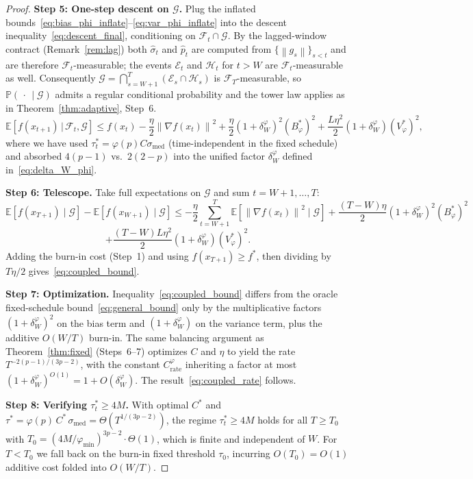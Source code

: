 \documentclass[11pt]{article}
\theoremstyle{definition}
\newcommand{\E}{\mathbb{E}}
\newcommand{\Prob}{\mathbb{P}}
\newcommand{\norm}[1]{\left\| #1 \right\|}
\newcommand{\phat}{\hat{p}}
\newcommand{\shat}{\hat{\sigma}}
\newcommand{\Filt}{\mathcal{F}}
\begin{document}
\begin{proof}
\medskip
\textbf{Step 5: One-step descent on $\mathcal{G}$.}
Plug the inflated bounds~\eqref{eq:bias_phi_inflate}--\eqref{eq:var_phi_inflate}
into the descent inequality~\eqref{eq:descent_final}, conditioning on
$\Filt_t \cap \mathcal{G}$. By the lagged-window contract
\textup{(}Remark~\ref{rem:lag}\textup{)} both $\shat_t$ and $\phat_t$ are
computed from $\{\norm{g_s}\}_{s < t}$ and are therefore
$\Filt_{t}$-measurable; the events $\mathcal{E}_t$ and $\mathcal{H}_t$ for
$t > W$ are $\Filt_t$-measurable as well. Consequently
$\mathcal G = \bigcap_{s = W+1}^T (\mathcal E_s \cap \mathcal H_s)$ is
$\Filt_T$-measurable, so $\Prob(\,\cdot\,\mid\mathcal G)$ admits a regular
conditional probability and the tower law applies as in Theorem~\ref{thm:adaptive}, Step~6.
\begin{equation}\label{eq:coupled_one_step}
  \E\!\left[f(x_{t+1}) \,\big|\, \Filt_t, \mathcal{G}\right]
  \leq f(x_t) - \frac{\eta}{2}\norm{\nabla f(x_t)}^2
    + \frac{\eta}{2}(1 + \delta_W^\varphi)^2 (B^{*}_\varphi)^2
    + \frac{L\eta^2}{2}(1 + \delta_W^\varphi)(V^{*}_\varphi)^2,
\end{equation}
where we have used $\tau_t^{*} = \varphi(p) C \sigma_{\mathrm{med}}$
(time-independent in the fixed schedule) and absorbed $4(p-1)$ vs.\ $2(2-p)$
into the unified factor $\delta_W^\varphi$ defined in~\eqref{eq:delta_W_phi}.

\medskip
\textbf{Step 6: Telescope.}
Take full expectations on $\mathcal{G}$ and sum
$t = W+1, \ldots, T$:
\[
  \E\!\left[f(x_{T+1}) \mid \mathcal{G}\right] - \E\!\left[f(x_{W+1}) \mid \mathcal{G}\right]
  \leq -\frac{\eta}{2}\sum_{t=W+1}^T \E\!\left[\norm{\nabla f(x_t)}^2 \mid \mathcal{G}\right]
    + \frac{(T-W)\eta}{2}(1 + \delta_W^\varphi)^2 (B^{*}_\varphi)^2
\]
\[
    + \frac{(T-W)L\eta^2}{2}(1 + \delta_W^\varphi)(V^{*}_\varphi)^2.
\]
Adding the burn-in cost (Step~1) and using $f(x_{T+1}) \geq f^{*}$, then
dividing by $T\eta/2$ gives~\eqref{eq:coupled_bound}.

\medskip
\textbf{Step 7: Optimization.}
Inequality~\eqref{eq:coupled_bound} differs from the oracle fixed-schedule
bound~\eqref{eq:general_bound} only by the multiplicative factors
$(1 + \delta_W^\varphi)^2$ on the bias term and $(1 + \delta_W^\varphi)$ on
the variance term, plus the additive $O(W/T)$ burn-in. The same balancing
argument as Theorem~\ref{thm:fixed} (Steps~6--7) optimizes $C$ and $\eta$ to
yield the rate $T^{-2(p-1)/(3p-2)}$, with the constant
$C_{\mathrm{rate}}^\varphi$ inheriting a factor at most
$(1 + \delta_W^\varphi)^{O(1)} = 1 + O(\delta_W^\varphi)$. The
result~\eqref{eq:coupled_rate} follows.

\medskip
\textbf{Step 8: Verifying $\tau_t^{*} \geq 4M$.}
With optimal $C^{*}$ and $\tau^{*} = \varphi(p)\, C^{*}\, \sigma_{\mathrm{med}}
= \Theta(T^{1/(3p-2)})$, the regime $\tau_t^{*} \geq 4M$ holds for all
$T \geq T_0$ with $T_0 = (4M / \varphi_{\min})^{3p-2} \cdot
\Theta(1)$, which is finite and independent of $W$. For $T < T_0$ we
fall back on the burn-in fixed threshold $\tau_0$, incurring $O(T_0) = O(1)$
additive cost folded into $O(W/T)$.
\end{proof}
\end{document}
